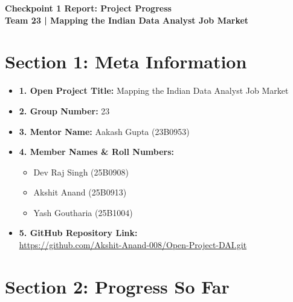 \documentclass[11pt, a4paper]{article}
\begin{document}
\begin{center}
    {\Large \bfseries Checkpoint 1 Report: Project Progress} \\[0.4em]
    \textbf{Team 23 | Mapping the Indian Data Analyst Job Market}
\end{center}

\vspace{0.5em}

\section*{Section 1: Meta Information}

\begin{itemize}
    \item \textbf{1. Open Project Title:} Mapping the Indian Data Analyst Job Market
    \item \textbf{2. Group Number:} 23
    \item \textbf{3. Mentor Name:} Aakash Gupta (23B0953)
    \item \textbf{4. Member Names \& Roll Numbers:}
    \begin{itemize}
        \item Dev Raj Singh (25B0908)
        \item Akshit Anand (25B0913)
        \item Yash Goutharia (25B1004)
    \end{itemize}
    \item \textbf{5. GitHub Repository Link:} \\
        \url{https://github.com/Akshit-Anand-008/Open-Project-DAI.git}
\end{itemize}

\vspace{0.5em}

\section*{Section 2: Progress So Far}
\end{document}
